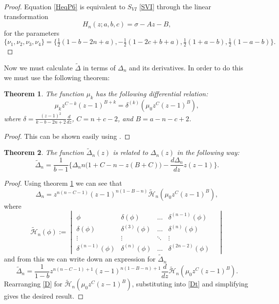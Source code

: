 \documentclass[12pt]{article}
\newtheorem{mydef}{Theorem}[section]
\numberwithin{figure}{section}
\numberwithin{equation}{section}
\numberwithin{table}{section}
\begin{document}
\begin{proof}
Equation \eqref{HeqP6} is equivalent to $S_{VI}$ \eqref{SVI} through the linear transformation
\begin{equation}
H_n(z;a,b,c)=\sigma-Az-B,
\end{equation}
for the parameters
\begin{equation}
\{\nu_1,\nu_2,\nu_3,\nu_4\}=\big\{\tfrac{1}{2}(1-b-2n+a),-\tfrac{1}{2}(1-2c+b+a),\tfrac{1}{2}(1+a-b),\tfrac{1}{2}(1-a-b)\big\}.
\end{equation}
\end{proof}
Now we must calculate $\widetilde\Delta$ in terms of $\Delta_n$ and its derivatives. In order to do this we must use the following theorem:
\begin{mydef}\label{thm4}
The function $\mu_k$ has the following differential relation:
$$\mu_kz^{C-k}(z-1)^{B+k}=\delta^{(k)}(\mu_0z^C(z-1)^B),$$
where $\delta=\frac{(z-1)^2}{k-b-2n+2}\frac{d}{dz}$, $C=n+c-2$, and $B=a-n-c+2$.
\end{mydef}
\begin{proof}
This can be shown easily using \cite[\S15.5(ii)]{DLMF}.
\end{proof}
\begin{mydef}
The function $\widetilde\Delta_n(z)$ is related to $\Delta_n(z)$ in the following way:
$$\widetilde\Delta_n=\frac{1}{b-1}\bigg\{\Delta_nn\big(1+C-n-z(B+C)\big)-\frac{d\Delta_n}{dz}z(z-1)\bigg\}.$$
\end{mydef}
\begin{proof}
Using theorem \ref{thm4} we can see that
\begin{equation}
\Delta_n=z^{n(n-C-1)}(z-1)^{n(1-B-n)}\mathcal{\widetilde{H}}_n(\mu_0z^C(z-1)^B),\label{D}
\end{equation}
where
\[\mathcal{\widetilde{H}}_n(\phi):=\begin{vmatrix}
\phi & \delta(\phi)   &\hdots& \delta^{(n-1)}(\phi) \\
\delta(\phi) & \delta^{(3)}(\phi) &\hdots& \delta^{(n)}(\phi)  \\
\vdots &\vdots &\ddots &\vdots & \\
\delta^{(n-1)}(\phi) & \delta^{(n)}(\phi) &\hdots& \delta^{(2n-2)}(\phi)
\end{vmatrix}\]
and from this we can write down an expression for $\widetilde\Delta_n$
\begin{equation}
\widetilde\Delta_n=\frac{1}{1-b}z^{n(n-C-1)+1}(z-1)^{n(1-B-n)+1}\frac{d}{dz}\mathcal{\widetilde{H}}_n(\mu_0z^C(z-1)^B).\label{Dt}
\end{equation}
Rearranging \eqref{D} for $\mathcal{\widetilde{H}}_n(\mu_0z^C(z-1)^B)$, substituting into \eqref{Dt} and simplifying gives the desired result.
\end{proof}
\end{document}
